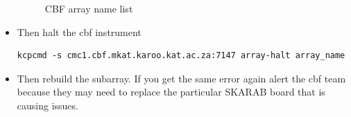 \begin{itemize}
\begin{figure}[!thb]
	\caption{CBF array name list}
	\label{fig:image118}
\end{figure}
\item{} Then halt the cbf instrument
\begin{lstlisting}[style=DOS]
kcpcmd -s cmc1.cbf.mkat.karoo.kat.ac.za:7147 array-halt array_name
\end{lstlisting}


\item{} Then rebuild the subarray. If you get the same error again alert the cbf team because they may need to replace the particular SKARAB board that is causing issues.
\end{itemize}

